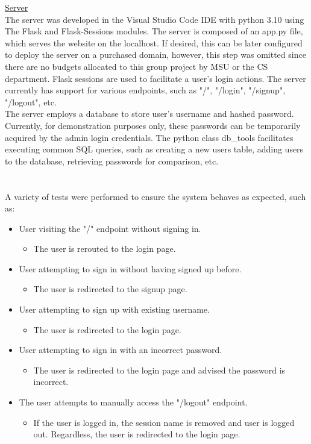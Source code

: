 \documentclass[12pt]{article}
\begin{document}
\noindent \underline{Server} \\
The server was developed in the Visual Studio Code IDE with python 3.10 using The Flask and Flask-Sessions modules. The server is composed of an app.py file, which serves the website on the localhost. If desired, this can be later configured to deploy the server on a purchased domain, however, this step was omitted since there are no budgets allocated to this group project by MSU or the CS department. Flask sessions are used to facilitate a user's login actions. The server currently has support for various endpoints, such as "/", "/login", "/signup", "/logout", etc. \\
The server employs a database to store user's username and hashed password. Currently, for demonstration purposes only, these passwords can be temporarily acquired by the admin login credentials. The python class db\_tools facilitates executing common SQL queries, such as creating a new users table, adding users to the database, retrieving passwords for comparison, etc.\\\\\\
A variety of tests were performed to ensure the system behaves as expected, such as:
\begin{itemize}
    \item User visiting the "/" endpoint without signing in.
    \begin{itemize}
        \item The user is rerouted to the login page.
    \end{itemize}
    \item User attempting to sign in without having signed up before.
    \begin{itemize}
        \item The user is redirected to the signup page.
    \end{itemize}
    \item User attempting to sign up with existing username.
    \begin{itemize}
        \item The user is redirected to the login page.
    \end{itemize}
    \item User attempting to sign in with an incorrect password.
    \begin{itemize}
        \item The user is redirected to the login page and advised the password is incorrect.
    \end{itemize}
    \item The user attempts to manually access the "/logout" endpoint.
    \begin{itemize}
        \item If the user is logged in, the session name is removed and user is logged out. Regardless, the user is redirected to the login page.
    \end{itemize}
\end{itemize}\\\\
\end{document}
